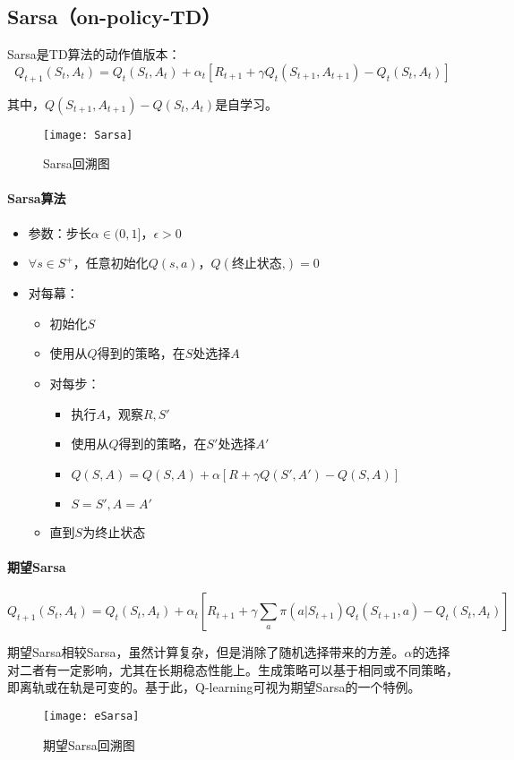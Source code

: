 \documentclass[
12pt, %
a4paper, 
oneside, %
headinclude,footinclude, %
]{scrartcl}
\begin{document}
\subsection{Sarsa（on-policy-TD）}
Sarsa是TD算法的动作值版本：
$$
Q_{t + 1}(S_t, A_t) = Q_t(S_t, A_t) + \alpha_t[R_{t + 1} + \gamma Q_t(S_{t + 1}, A_{t + 1}) - Q_t(S_t, A_t)]
$$

其中，$ Q(S_{t + 1}, A_{t + 1}) - Q(S_t, A_t) $是自学习。

\begin{figure}[H]
\centering
\texttt{[image: Sarsa]}
\caption[Sarsa回溯图]{Sarsa回溯图}
\end{figure}
\paragraph{Sarsa算法}
\begin{itemize}
\item 参数：步长$ \alpha \in (0,1] $，$ \epsilon > 0 $
\item $ \forall s \in S^+ $，任意初始化$ Q(s,a) $，$ Q(\text{终止状态,}) = 0 $
\item 对每幕：
\begin{itemize}
\item 初始化$ S $
\item 使用从$ Q $得到的策略，在$ S $处选择$ A $
\item 对每步：
\begin{itemize}
\item 执行$ A $，观察$ R,S' $
\item 使用从$ Q $得到的策略，在$ S' $处选择$ A' $
\item $ Q(S, A) = Q(S, A) + \alpha [R + \gamma Q(S', A') - Q(S, A)] $
\item $ S = S', A = A' $
\end{itemize}
\item 直到$ S $为终止状态
\end{itemize}
\end{itemize}
\paragraph{期望Sarsa}
$$
Q_{t + 1}(S_t, A_t) = Q_t(S_t, A_t) + \alpha_t[R_{t + 1} + \gamma \sum_a \pi(a|S_{t + 1}) Q_t(S_{t + 1}, a) - Q_t(S_t, A_t)]
$$

期望Sarsa相较Sarsa，虽然计算复杂，但是消除了随机选择带来的方差。$ \alpha $的选择对二者有一定影响，尤其在长期稳态性能上。生成策略可以基于相同或不同策略，即离轨或在轨是可变的。基于此，Q-learning可视为期望Sarsa的一个特例。
\begin{figure}[H]
\centering
\texttt{[image: eSarsa]}
\caption[期望Sarsa回溯图]{期望Sarsa回溯图}
\end{figure}
\end{document}
